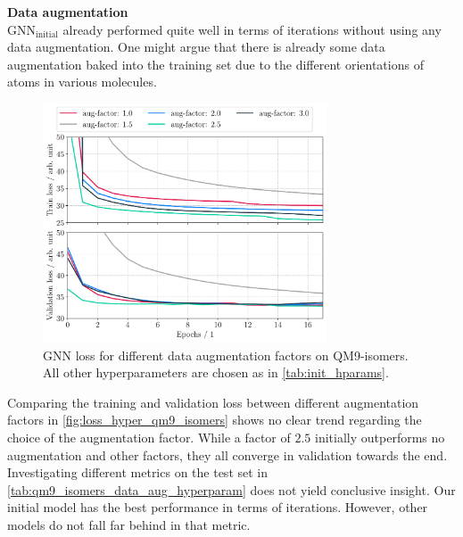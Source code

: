 \textbf{Data augmentation}\\
$\text{GNN}_\text{initial}$ already performed quite well in terms of iterations without using any data augmentation. One might argue that there is already some data augmentation baked into the training set due to the different orientations of atoms in various molecules. 
\begin{figure}[h]
    \centering
    \includegraphics[width=0.75\textwidth]{../fig/application/aug_train_val_loss.pdf}
    \caption[GNN loss for different augmentation factors on QM9-isomers]{GNN loss for different data augmentation factors on QM9-isomers. All other hyperparameters are chosen as in \autoref{tab:init_hparams}.}
    \label{fig:loss_hyper_qm9_isomers}
\end{figure}
Comparing the training and validation loss between different augmentation factors in \autoref{fig:loss_hyper_qm9_isomers} shows no clear trend regarding the choice of the augmentation factor. While a factor of $2.5$ initially outperforms no augmentation and other factors, they all converge in validation towards the end. 
Investigating different metrics on the test set in \autoref{tab:qm9_isomers_data_aug_hyperparam} does not yield conclusive insight. Our initial model has the best performance in terms of iterations. However, other models do not fall far behind in that metric.
